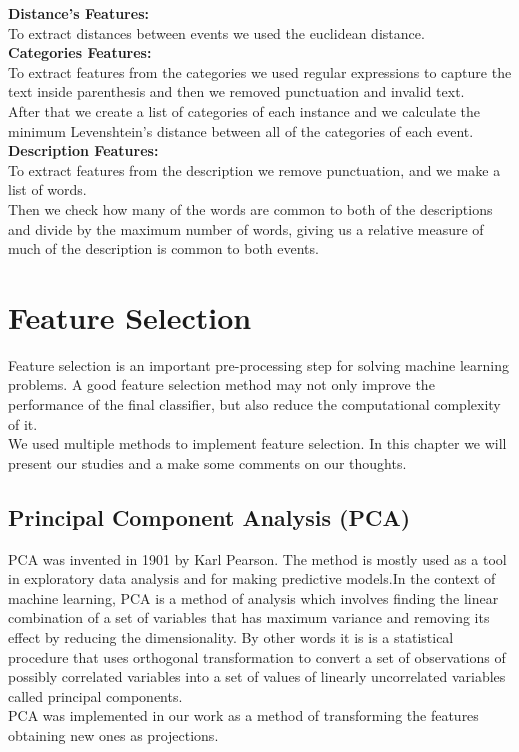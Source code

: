 \documentclass[english, a4paper, 12pt]{article}
\newcommand{\tab}{\hspace*{2em}}
\begin{document}
{\bf Distance's Features:}\medskip\\
\tab  To extract distances between events we used the euclidean distance.\medskip\\

{\bf Categories Features:}\medskip\\
\tab  To extract features from the categories we used regular expressions to capture the text inside parenthesis and then we removed punctuation and invalid text.\\
\tab  After that we create a list of categories of each instance and we calculate the minimum Levenshtein's distance between all of the categories of each event.
\medskip\\

{\bf Description Features:}\medskip\\
\tab  To extract features from the description we remove punctuation, and we make a list of words.\\
\tab  Then we check how many of the words are common to both of the descriptions and divide by the maximum number of words, giving us a relative measure of much of the description is common to both events.
\medskip\\

\section{Feature Selection}
\tab Feature selection is an important pre-processing step for solving machine learning problems. A good feature selection method may not only improve the performance of the final classifier, but also reduce the computational complexity of it.\\
\tab We used multiple methods to implement feature selection. In this chapter we will present our studies and a make some comments on our thoughts.
\subsection{Principal Component Analysis (PCA)}
\tab PCA was invented in 1901 by Karl Pearson. The method is mostly used as a tool in exploratory data analysis and for making predictive models.In the context of machine learning, PCA is a method of analysis which involves finding the linear combination of a set of variables that has maximum variance and removing its effect by reducing the dimensionality. By other words it is is a statistical procedure that uses orthogonal transformation to convert a set of observations of possibly correlated variables into a set of values of linearly uncorrelated variables called principal components.\\
\tab PCA was implemented in our work as a method of transforming the features obtaining new ones as projections.
\end{document}
